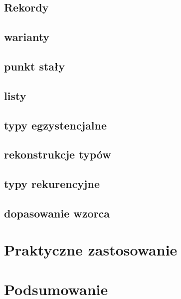 \documentclass[11pt,leqno]{article}
\begin{document}
\subsection{Rekordy}
\subsection{warianty}
\subsection{punkt stały}
\subsection{listy}
\subsection{typy egzystencjalne}
\subsection{rekonstrukcje typów}
\subsection{typy rekurencyjne}
\subsection{dopasowanie wzorca}


\section{Praktyczne zastosowanie}                       
\setcounter{equation}{0}


\section{Podsumowanie}                       
\setcounter{equation}{0}
\end{document}
